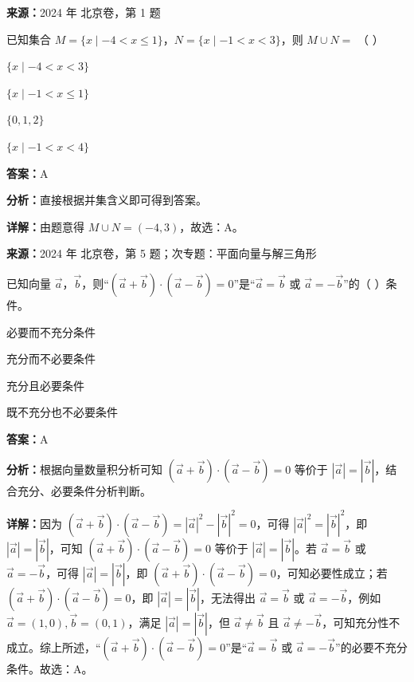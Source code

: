 \begin{question}[points=4]
\textbf{来源：}2024 年 北京卷，第 1 题\par
已知集合 $M = \{ x \mid -4 < x \leq 1 \}$，$N = \{x \mid -1 < x < 3\}$，则 $M \cup N =$ （ ）
\begin{choices}
  \item $\{x \mid -4 < x < 3\}$
  \item $\{x \mid -1 < x \leq 1\}$
  \item $\{0,1,2\}$
  \item $\{x \mid -1 < x < 4\}$
\end{choices}
\begin{solution}
\textbf{答案：}A

\textbf{分析：}直接根据并集含义即可得到答案。

\textbf{详解：}由题意得 $M \cup N = (-4,3)$，故选：A。
\end{solution}
\end{question}

\begin{question}[points=4]
\textbf{来源：}2024 年 北京卷，第 5 题；次专题：平面向量与解三角形\par
已知向量 $\vec{a}$，$\vec{b}$，则“$(\vec{a}+\vec{b})\cdot(\vec{a}-\vec{b})=0$”是“$\vec{a}=\vec{b}$ 或 $\vec{a}=-\vec{b}$”的（ ）条件。
\begin{choices}
  \item 必要而不充分条件
  \item 充分而不必要条件
  \item 充分且必要条件
  \item 既不充分也不必要条件
\end{choices}
\begin{solution}
\textbf{答案：}A

\textbf{分析：}根据向量数量积分析可知 $(\vec{a}+\vec{b})\cdot(\vec{a}-\vec{b})=0$ 等价于 $|\vec{a}|=|\vec{b}|$，结合充分、必要条件分析判断。

\textbf{详解：}因为 $(\vec{a}+\vec{b})\cdot(\vec{a}-\vec{b}) = |\vec{a}|^2-|\vec{b}|^2=0$，可得 $|\vec{a}|^2=|\vec{b}|^2$，即 $|\vec{a}|=|\vec{b}|$，可知 $(\vec{a}+\vec{b})\cdot(\vec{a}-\vec{b})=0$ 等价于 $|\vec{a}|=|\vec{b}|$。若 $\vec{a}=\vec{b}$ 或 $\vec{a}=-\vec{b}$，可得 $|\vec{a}|=|\vec{b}|$，即 $(\vec{a}+\vec{b})\cdot(\vec{a}-\vec{b})=0$，可知必要性成立；若 $(\vec{a}+\vec{b})\cdot(\vec{a}-\vec{b})=0$，即 $|\vec{a}|=|\vec{b}|$，无法得出 $\vec{a}=\vec{b}$ 或 $\vec{a}=-\vec{b}$，例如 $\vec{a}=(1,0),\vec{b}=(0,1)$，满足 $|\vec{a}|=|\vec{b}|$，但 $\vec{a}\neq\vec{b}$ 且 $\vec{a}\neq-\vec{b}$，可知充分性不成立。综上所述，“$(\vec{a}+\vec{b})\cdot(\vec{a}-\vec{b})=0$”是“$\vec{a}=\vec{b}$ 或 $\vec{a}=-\vec{b}$”的必要不充分条件。故选：A。
\end{solution}
\end{question}

